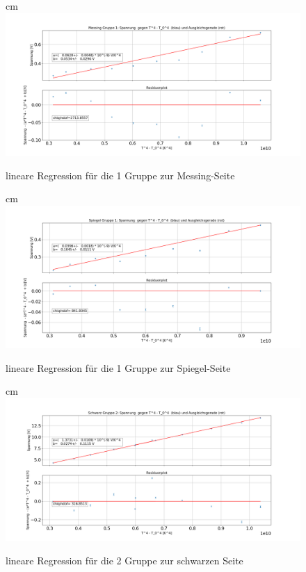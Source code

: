 \documentclass[a4paper, 11pt]{article}
\begin{document}
\begin{center}
\begin{figure}[H]
	 cm
	\includegraphics[scale=0.42]{Bilder/Gruppe1_Messing.png}%
	\caption[lineare Regression für die 1 Gruppe zur Messing-Seite]{lineare Regression für die 1 Gruppe zur Messing-Seite}%
	\label{pic:Abbildung 2}%
\end{figure}

\begin{figure}[H]
	 cm
	\includegraphics[scale=0.42]{Bilder/Gruppe1_Spiegel.png}%
	\caption[lineare Regression für die 1 Gruppe zur Spiegel-Seite]{lineare Regression für die 1 Gruppe zur Spiegel-Seite}%
	\label{pic:Abbildung 2}%
\end{figure}

\begin{figure}[H]
	 cm
	\includegraphics[scale=0.42]{Bilder/Gruppe2_Schwarz.png}%
	\caption[lineare Regression für die 2 Gruppe zur schwarzen Seite]{lineare Regression für die 2 Gruppe zur schwarzen Seite}%
	\label{pic:Abbildung 2}%
\end{figure}


\end{center}
\end{document}
